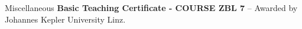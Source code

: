 \begin{rubric}{Miscellaneous}
\entry*[2021] \textbf{Basic Teaching Certificate - COURSE ZBL 7} -- Awarded by Johannes Kepler University Linz.

\end{rubric}